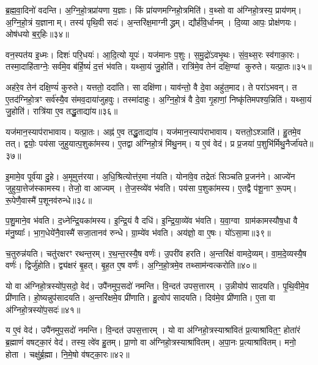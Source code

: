 ब्र॒ह्म॒वा॒दिनो॑ वदन्ति।
अ॒ग्नि॒हो॒त्रप्रा॑यणा य॒ज्ञाः।
किं प्रा॑यणमग्निहो॒त्रमिति॑।
व॒थ्सो वा अ॑ग्निहो॒त्रस्य॒ प्राय॑णम्।
अ॒ग्नि॒हो॒त्रं य॒ज्ञानाम्।
तस्य॑ पृथि॒वी सदः॑।
अ॒न्तरि॑क्ष॒माग्नीद्ध्रम्।
द्यौर्\mbox{}ह॑वि॒र्धानम्।
दि॒व्या आपः॒ प्रोक्ष॑णयः।
ओष॑धयो ब॒र्॒हिः॥३४॥

वन॒स्पत॑य इ॒ध्मः।
दिशः॑ परि॒धयः॑।
आ॒दि॒त्यो यूपः॑।
यज॑मानः प॒शुः।
स॒मु॒द्रो॑\-ऽवभृ॒थः।
सं॒व॒थ्स॒रः स्व॑गाका॒रः।
तस्मा॒दाहि॑ताग्नेः॒ सर्व॑मे॒व ब॑र्हि॒ष्यं॑ द॒त्तं भ॑वति।
यथ्सा॒यं जु॒होति॑।
रात्रि॑मे॒व तेन॑ दक्षि॒ण्यां कुरुते।
यत्प्रा॒तः॥३५॥

अह॑रे॒व तेन॑ दक्षि॒ण्यं॑ कुरुते।
यत्ततो॒ ददा॑ति।
सा दक्षि॑णा।
याव॑न्तो॒ वै दे॒वा अहु॑त॒माद\sn{}।
ते परा॑\-ऽभवन्।
त ए॒तद॑ग्निहो॒त्रꣳ सर्व॑स्यै॒व स॑मव॒दाया॑जुहवुः।
तस्मा॑दाहुः।
अ॒ग्नि॒हो॒त्रं वै दे॒वा गृ॒हाणां॒ निष्कृ॑तिमपश्य॒न्निति॑।
यथ्सा॒यं जु॒होति॑।
रात्रि॑या ए॒व तद्धु॒ताद्या॑य॥३६॥

यज॑मान॒स्याप॑रा\-भावाय।
यत्प्रा॒तः।
अह्न॑ ए॒व तद्धु॒ताद्या॑य।
यज॑मान॒स्याप॑राभावाय।
यत्ततो॒\-ऽश्ञाति॑।
हु॒तमे॒व तत्।
द्वयोः॒ पय॑सा जुहुयात्प॒शुका॑मस्य।
ए॒तद्वा अ॑ग्निहो॒त्रं मि॑थु॒नम्।
य ए॒वं वेद॑।
प्र प्र॒जया॑ प॒शुभि॑र्मिथु॒नैर्जा॑यते॥३७॥

इ॒मामे॒व पूर्व॑या दु॒हे।
अ॒मूमुत्त॑रया।
अ॒धि॒श्रित्योत्त॑र॒मा न॑यति।
योना॑वे॒व तद्रेतः॑ सिञ्चति प्र॒जन॑ने।
आज्ये॑न जुहुया॒त्तेज॑स्कामस्य।
तेजो॒ वा आज्यम्।
ते॒ज॒स्व्ये॑व भ॑वति।
पय॑सा प॒शुका॑मस्य।
ए॒तद्वै प॑शू॒नाꣳ रू॒पम्।
रू॒पेणै॒वास्मै॑ प॒शूनव॑रुन्धे॥३८॥

प॒शु॒माने॒व भ॑वति।
द॒ध्नेन्द्रि॒यका॑मस्य।
इ॒न्द्रि॒यं वै दधि॑।
इ॒न्द्रि॒या॒व्ये॑व भ॑वति।
य॒वा॒ग्वा ग्राम॑कामस्यौष॒धा वै म॑नु॒ष्याः᳚।
भा॒ग॒धेये॑नै॒वास्मै॑ सजा॒तानव॑ रुन्धे।
ग्रा॒म्ये॑व भ॑वति।
अय॑ज्ञो॒ वा ए॒षः।
यो॑ऽसा॒मा॥३९॥

च॒तुरुन्न॑यति।
चतु॑रक्षरꣳ रथन्त॒रम्।
र॒थ॒न्त॒रस्यै॒ष वर्णः॑।
उ॒परी॑व हरति।
अ॒न्तरि॑क्षं वामदे॒व्यम्।
वा॒म॒दे॒व्यस्यै॒ष वर्णः॑।
द्विर्जु॑होति।
द्व्य॑क्षरं बृ॒हत्।
बृ॒ह॒त ए॒ष वर्णः॑।
अ॒ग्नि॒हो॒त्रमे॒व तथ्साम॑न्वत्करोति॥४०॥

यो वा अ॑ग्निहो॒त्रस्यो॑प॒सदो॒ वेद॑।
उपै॑नमुप॒सदो॑ नमन्ति।
वि॒न्दत॑ उपस॒त्तारम्।
उ॒न्नीयोप॑ सादयति।
पृ॒थि॒वीमे॒व प्री॑णाति।
हो॒ष्यन्नुप॑सादयति।
अ॒न्तरि॑क्षमे॒व प्री॑णाति।
हु॒त्वोप॑ सादयति।
दिव॑मे॒व प्री॑णाति।
ए॒ता वा अ॑ग्निहो॒त्रस्यो॑प॒सदः॑॥४१॥

य ए॒वं वेद॑।
उपै॑नमुप॒सदो॑ नमन्ति।
वि॒न्दत॑ उपस॒त्तारम्।
यो वा अ॑ग्निहो॒त्रस्याश्रा॑वितं प्र॒त्याश्रा॑वित॒ꣳ॒ होता॑रं ब्र॒ह्माणं॑ वषट्का॒रं वेद॑।
तस्य॒ त्वे॑व हु॒तम्।
प्रा॒णो वा अ॑ग्निहो॒त्रस्याश्रा॑वितम्।
अ॒पा॒नः प्र॒त्याश्रा॑वितम्।
मनो॒ होता।
चक्षु॑र्ब्र॒ह्मा।
नि॒मे॒षो व॑षट्का॒रः॥४२॥

